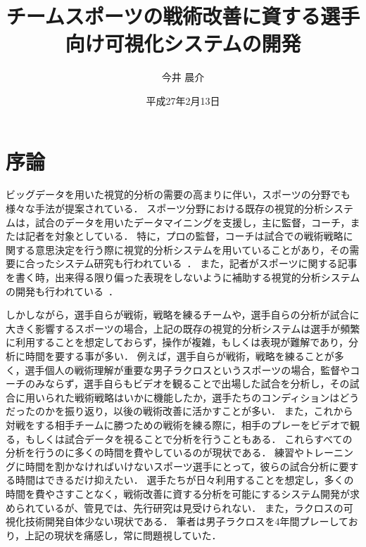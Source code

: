\documentclass[sotsuron]{kuee}
\title{チームスポーツの戦術改善に資する選手向け可視化システムの開発}
\author{今井 晨介}
\date{平成27年2月13日}
\begin{document}
\maketitle
\tableofcontents


\chapter{序論}
	ビッグデータを用いた視覚的分析の需要の高まりに伴い，スポーツの分野でも様々な手法が提案されている．
	スポーツ分野における既存の視覚的分析システムは，試合のデータを用いたデータマイニングを支援し，主に監督，コーチ，または記者を対象としている．
	特に，プロの監督，コーチは試合での戦術戦略に関する意思決定を行う際に視覚的分析システムを用いていることがあり，その需要に合ったシステム研究も行われている~\cite{SoccerStory,SnapShot,TenniVis}．
	また，記者がスポーツに関する記事を書く時，出来得る限り偏った表現をしないように補助する視覚的分析システムの開発も行われている~\cite{SoccerStory}．
	
	しかしながら，選手自らが戦術，戦略を練るチームや，選手自らの分析が試合に大きく影響するスポーツの場合，上記の既存の視覚的分析システムは選手が頻繁に利用することを想定しておらず，操作が複雑，もしくは表現が難解であり，分析に時間を要する事が多い．
	例えば，選手自らが戦術，戦略を練ることが多く，選手個人の戦術理解が重要な男子ラクロスというスポーツの場合，監督やコーチのみならず，選手自らもビデオを観ることで出場した試合を分析し，その試合に用いられた戦術戦略はいかに機能したか，選手たちのコンディションはどうだったのかを振り返り，以後の戦術改善に活かすことが多い．
	また，これから対戦をする相手チームに勝つための戦術を練る際に，相手のプレーをビデオで観る，もしくは試合データを視ることで分析を行うこともある．
	これらすべての分析を行うのに多くの時間を費やしているのが現状である．
	練習やトレーニングに時間を割かなければいけないスポーツ選手にとって，彼らの試合分析に要する時間はできるだけ抑えたい．
	選手たちが日々利用することを想定し，多くの時間を費やさすことなく，戦術改善に資する分析を可能にするシステム開発が求められているが、管見では、先行研究は見受けられない．
	また，ラクロスの可視化技術開発自体少ない現状である．
	筆者は男子ラクロスを4年間プレーしており，上記の現状を痛感し，常に問題視していた．
	
\end{document}
